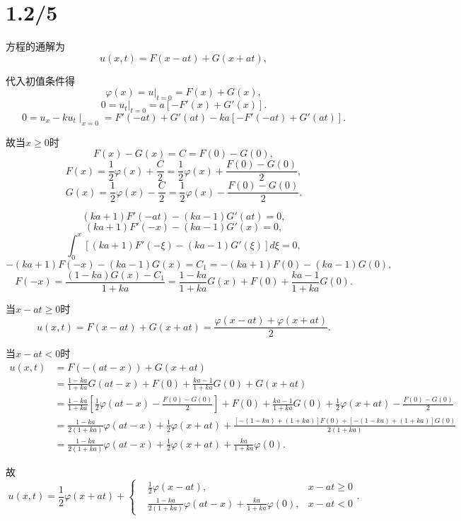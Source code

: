 \documentclass[11pt,a4paper]{article}
\begin{document}
\section{1.2/5}
方程的通解为
$$u(x,t)=F(x-at)+G(x+at),$$

代入初值条件得
$$\varphi(x)=u|_{t=0}=F(x)+G(x),$$
$$0=u_t|_{t=0}=a[-F'(x)+G'(x)].$$
$$0=u_x-ku_t\mid_{x=0}=F'(-at)+G'(at)-ka[-F'(-at)+G'(at)].$$

故当$x\geqslant 0$时
$$F(x)-G(x)=C=F(0)-G(0),$$
$$F(x)=\frac{1}{2}\varphi(x)+\frac{C}{2}=\frac{1}{2}\varphi(x)+\frac{F(0)-G(0)}{2},$$
$$G(x)=\frac{1}{2}\varphi(x)-\frac{C}{2}=\frac{1}{2}\varphi(x)-\frac{F(0)-G(0)}{2}.$$

$$(ka+1)F'(-at)-(ka-1)G'(at)=0,$$
$$(ka+1)F'(-x)-(ka-1)G'(x)=0,$$
$$\int_0^x[(ka+1)F'(-\xi)-(ka-1)G'(\xi)]d\xi=0,$$
$$-(ka+1)F(-x)-(ka-1)G(x)=C_1=-(ka+1)F(0)-(ka-1)G(0),$$
$$F(-x)=\frac{(1-ka)G(x)-C_1}{1+ka}=\frac{1-ka}{1+ka}G(x)+F(0)+\frac{ka-1}{1+ka}G(0).$$

当$x-at\geqslant 0$时
$$u(x,t)=F(x-at)+G(x+at)=\frac{\varphi(x-at)+\varphi(x+at)}{2}.$$

当$x-at<0$时
\begin{align*}
  u(x,t) & =F(-(at-x))+G(x+at)                                                                                                                                 \\
         & =\frac{1-ka}{1+ka}G(at-x)+F(0)+\frac{ka-1}{1+ka}G(0)+G(x+at)                                                                                        \\
         & =\frac{1-ka}{1+ka}\left[\frac{1}{2}\varphi(at-x)-\frac{F(0)-G(0)}{2}\right]+F(0)+\frac{ka-1}{1+ka}G(0)+\frac{1}{2}\varphi(x+at)-\frac{F(0)-G(0)}{2} \\
         & =\frac{1-ka}{2(1+ka)}\varphi(at-x)+\frac{1}{2}\varphi(x+at)+\frac{[-(1-ka)+(1+ka)]F(0)+[-(1-ka)+(1+ka)]G(0)}{2(1+ka)}                               \\
         & =\frac{1-ka}{2(1+ka)}\varphi(at-x)+\frac{1}{2}\varphi(x+at)+\frac{ka}{1+ka}\varphi(0).
\end{align*}

故
$$u(x,t)=\frac{1}{2}\varphi(x+at)+\left\{\begin{aligned}
     & \frac{1}{2}\varphi(x-at),                                    & x-at\geqslant 0 \\
     & \frac{1-ka}{2(1+ka)}\varphi(at-x)+\frac{ka}{1+ka}\varphi(0), & x-at<0
  \end{aligned}\right..$$
\end{document}
